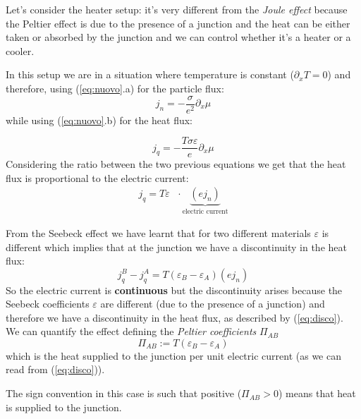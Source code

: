 \documentclass[\main/main.tex]{subfiles}
\begin{document}
Let's consider the heater setup: it's very different from the \textit{Joule effect} because the Peltier effect is due to the presence of a junction and the heat can be either taken or absorbed by the junction and we can control whether it's a heater or a cooler.

In this setup we are in a situation where temperature is constant ($\partial_x T=0$) and therefore, using (\ref{eq:nuovo}.a) for the particle flux:
\begin{equation}
    j_n=-\frac{\sigma}{e^2}\partial_x\mu
\end{equation}
while using (\ref{eq:nuovo}.b) for the heat flux:

\begin{equation}
    j_q=-\frac{T\sigma\varepsilon}{e}\partial_x\mu
\end{equation}
Considering the ratio between the two previous equations we get that the heat flux is proportional to the electric current:
\begin{align}
    j_q=T\varepsilon \,\,\,\, \cdot \underbrace{(e j_n)}_{\text{electric current}}
\end{align}

From the Seebeck effect we have learnt that for two different materials $\varepsilon$ is different which implies that at the junction we have a discontinuity in the heat flux:
\begin{equation}
    j_q^B-j_q^A=T(\varepsilon_B-\varepsilon_A)(e j_n)
    \label{eq:disco}
\end{equation}
So the electric current is \textbf{continuous} but the discontinuity arises because the Seebeck coefficients $\varepsilon$ are different (due to the presence of a junction) and therefore we have a discontinuity in the heat flux, as described by (\ref{eq:disco}). \\

We can quantify the effect defining the \textit{Peltier coefficients} $\Pi_{AB}$
\begin{equation}
    \boxed{\Pi_{A B}:=T\left(\varepsilon_{B}-\varepsilon_{A}\right)}
\end{equation}
which is the heat supplied to the junction per unit electric current (as we can read from (\ref{eq:disco})).

The sign convention in this case is such that positive ($\Pi_{AB}>0$) means that heat is supplied to the junction. \\
\end{document}
